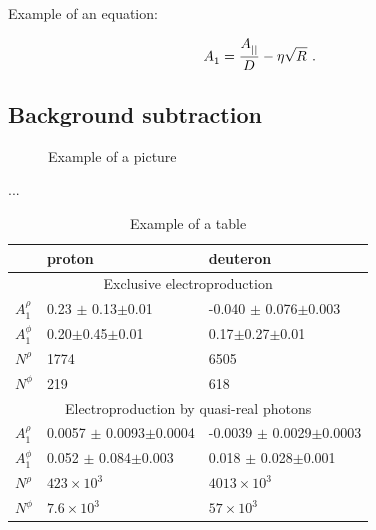 \documentclass[epj,nopacs]{svjour}
\begin{document}
Example of an equation:

\begin{equation}
\label{a1vm}
A_{1}^{} = \frac{A^{}_{||}}{D^{}}  - \eta \sqrt{R^{}}\ . \\
\end{equation}


\subsection{Background subtraction}

\begin{figure}[ht]
\vspace*{-0.2cm}
\caption{\baselineskip=0.38cm Example of a picture}
\label{fig:1}   
\end{figure} 
...


\begin{table}[h]
\begin{center}
\begin{tabular}{|l|l|l|}
\hline
\multicolumn{1}{|c|}{}& proton & deuteron\\
\hline
\multicolumn{3}{|c|}{Exclusive electroproduction}\\
\hline
$A^\rho_1$       & 0.23 $\pm$ 0.13$\pm$0.01 & -0.040 $\pm$ 0.076$\pm$0.003\\ 
$A^\phi_1$       & 0.20$\pm$0.45$\pm$0.01  & 0.17$\pm$0.27$\pm$0.01\\
$N^\rho$         &1774                   & 6505\\
$N^\phi$         & 219                   & 618 \\
\hline
\multicolumn{3}{|c|}{Electroproduction by quasi-real photons}\\
\hline
$A^\rho_1$  & 0.0057 $\pm$ 0.0093$\pm$0.0004  & -0.0039 $\pm$ 0.0029$\pm$0.0003\\ 
$A^\phi_1$  & 0.052 $\pm$ 0.084$\pm$0.003  & 0.018 $\pm$ 0.028$\pm$0.001\\
$N^\rho$    & $423\times10^{3}$ & $4013\times10^{3}$\\
$N^\phi$ & $7.6\times10^{3}$ &  $57\times10^{3}$ \\
\hline
\end{tabular}
\vspace*{0.3cm}
\caption{\baselineskip=0.38cm Example of a table}
\label{tab_asy}
\end{center}
\vspace*{-0.5cm}
\end{table}
\end{document}
